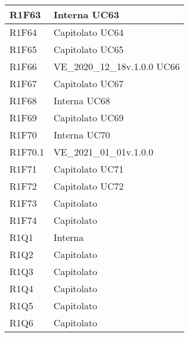 \begin{center}
\begin{longtable}{|p{22mm}|p{44mm}|}
R1F63 &
Interna \newline
UC63 
\\
\hline

R1F64 &
Capitolato \newline
UC64 
\\
\hline

R1F65 &
Capitolato \newline
UC65 
\\
\hline

R1F66 &
VE\_2020\_12\_18v.1.0.0 \newline
UC66 
\\
\hline

R1F67 &
Capitolato \newline
UC67 
\\
\hline

R1F68 &
Interna \newline
UC68 
\\
\hline

R1F69 &
Capitolato \newline
UC69 
\\
\hline

R1F70 &
Interna \newline
UC70 
\\
\hline

R1F70.1 &
VE\_2021\_01\_01v.1.0.0 
\\
\hline

R1F71 &
Capitolato \newline
UC71 
\\
\hline

R1F72 &
Capitolato \newline
UC72 
\\
\hline

R1F73 &
Capitolato 
\\
\hline

R1F74 &
Capitolato 
\\
\hline

R1Q1 &
Interna 
\\
\hline

R1Q2 &
Capitolato 
\\
\hline

R1Q3 &
Capitolato 
\\
\hline

R1Q4 &
Capitolato 
\\
\hline

R1Q5 &
Capitolato 
\\
\hline

R1Q6 &
Capitolato 
\\
\hline


\end{longtable}
\end{center}
